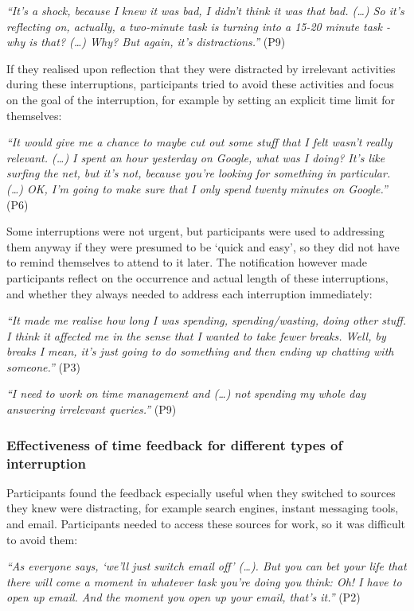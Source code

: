 \textit{“It's a shock, because I knew it was bad, I didn't think it was that bad. (…) So it's reflecting on, actually, a two-minute task is turning into a 15-20 minute task - why is that? (…) Why? But again, it's distractions.”} (P9)

If they realised upon reflection that they were distracted by irrelevant activities during these interruptions, participants tried to avoid these activities and focus on the goal of the interruption, for example by setting an explicit time limit for themselves:
 
 \textit{“It would give me a chance to maybe cut out some stuff that I felt wasn’t really relevant. (…) I spent an hour yesterday on Google, what was I doing? It’s like surfing the net, but it’s not, because you’re looking for something in particular. (…) OK, I’m going to make sure that I only spend twenty minutes on Google.”} (P6)
 
Some interruptions were not urgent, but participants were used to addressing them anyway if they were presumed to be ‘quick and easy’, so they did not have to remind themselves to attend to it later. The notification however made participants reflect on the occurrence and actual length of these interruptions, and whether they always needed to address each interruption immediately:

\textit{ “It made me realise how long I was spending, spending/wasting, doing other stuff. I think it affected me in the sense that I wanted to take fewer breaks. Well, by breaks I mean, it’s just going to do something and then ending up chatting with someone.”} (P3)

\textit{“I need to work on time management and (…) not spending my whole day answering irrelevant queries.”} (P9)

\subsubsection{Effectiveness of time feedback for different types of interruption}
Participants found the feedback especially useful when they switched to sources they knew were distracting, for example search engines, instant messaging tools, and email. Participants needed to access these sources for work, so it was difficult to avoid them:

\textit{“As everyone says, ‘we’ll just switch email off’ (…). But you can bet your life that there will come a moment in whatever task you’re doing you think: Oh! I have to open up email. And the moment you open up your email, that’s it.”} (P2)

